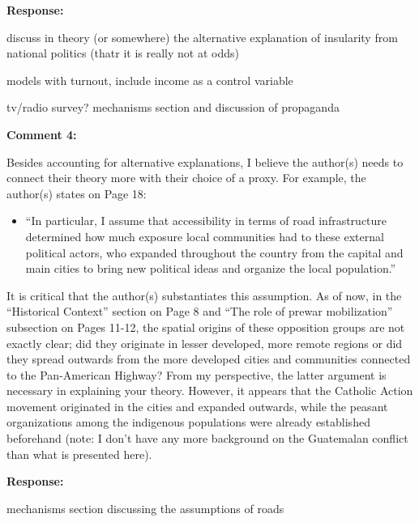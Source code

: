 \documentclass[12pt, a4paper, notitlepage]{article}
\begin{document}
\noindent\textbf{Response:} {}

discuss in theory (or somewhere) the alternative explanation of insularity from national politics (thatr it is really not at odds)

models with turnout, include income as a control variable

tv/radio survey? mechanisms section and discussion of propaganda

\vspace{15pt}
\noindent\textbf{Comment 4:}
\begin{displayquote}
Besides accounting for alternative explanations, I believe the author(s) needs to connect their theory more with their choice of a proxy. For example, the author(s) states on Page 18:
\begin{itemize}
  \item[] ``In particular, I assume that accessibility in terms of road infrastructure determined how much exposure local communities had to these external political actors, who expanded throughout the country from the capital and main cities to bring new political ideas and organize the local population.''
\end{itemize}
It is critical that the author(s) substantiates this assumption. As of now, in the “Historical Context” section on Page 8 and “The role of prewar mobilization” subsection on Pages 11-12, the spatial origins of these opposition groups are not exactly clear; did they originate in lesser developed, more remote regions or did they spread outwards from the more developed cities and communities connected to the Pan-American Highway? From my perspective, the latter argument is necessary in explaining your theory. However, it appears that the Catholic Action movement originated in the cities and expanded outwards, while the peasant organizations among the indigenous populations were already established beforehand (note: I don’t have any more background on the Guatemalan conflict than what is presented here).
\end{displayquote}

\noindent\textbf{Response:} {}

mechanisms section discussing the assumptions of roads
\end{document}
